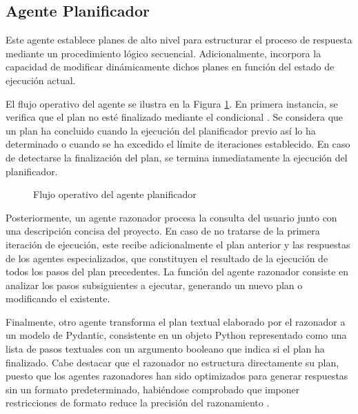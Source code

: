 \subsection{Agente Planificador}
Este agente establece planes de alto nivel para estructurar el proceso de respuesta mediante un procedimiento lógico secuencial. Adicionalmente, incorpora la capacidad de modificar dinámicamente dichos planes en función del estado de ejecución actual.

El flujo operativo del agente se ilustra en la Figura \ref{fig:planner}. En primera instancia, se verifica que el plan no esté finalizado mediante el condicional . Se considera que un plan ha concluido cuando la ejecución del planificador previo así lo ha determinado o cuando se ha excedido el límite de iteraciones establecido. En caso de detectarse la finalización del plan, se termina inmediatamente la ejecución del planificador.

\begin{figure}[h]
\centering
{}
\caption{Flujo operativo del agente planificador}
\label{fig:planner}
\end{figure}
Posteriormente, un agente razonador procesa la consulta del usuario junto con una descripción concisa del proyecto. En caso de no tratarse de la primera iteración de ejecución, este recibe adicionalmente el plan anterior y las respuestas de los agentes especializados, que constituyen el resultado de la ejecución de todos los pasos del plan precedentes. La función del agente razonador consiste en analizar los pasos subsiguientes a ejecutar, generando un nuevo plan o modificando el existente.

Finalmente, otro agente transforma el plan textual elaborado por el razonador a un modelo de Pydantic, consistente en un objeto Python representado como una lista de pasos textuales con un argumento booleano que indica si el plan ha finalizado. Cabe destacar que el razonador no estructura directamente su plan, puesto que los agentes razonadores han sido optimizados para generar respuestas sin un formato predeterminado, habiéndose comprobado que imponer restricciones de formato reduce la precisión del razonamiento \cite{tam_let_2024}.

